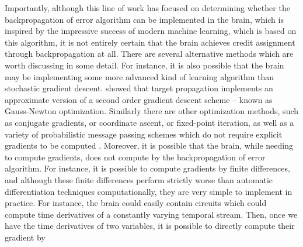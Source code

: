 Importantly, although this line of work has focused on determining whether the backpropagation of error algorithm can be implemented in the brain, which is inspired by the impressive success of modern machine learning, which is based on this algorithm, it is not entirely certain that the brain achieves credit assignment through backpropagation at all. There are several alternative methods which are worth discussing in some detail. For instance, it is also possible that the brain may be implementing some more advanced kind of learning algorithm than stochastic gradient descent. \citet{meulemans2020theoretical} showed that target propagation implements an approximate version of a second order gradient descent scheme -- known as Gauss-Newton optimization. Similarly there are other optimization methods, such as conjugate gradients, or coordinate ascent, or fixed-point iteration, as well as a variety of probabilistic message passing schemes which do not require explicit gradients to be computed \citep{yedidia2011message,parr2019neuronal}. Moreover, it is possible that the brain, while needing to compute gradients, does not compute by the backpropagation of error algorithm. For instance, it is possible to compute gradients by finite differences, and although these finite differences perform strictly worse than automatic differentiation techniques computationally, they are very simple to implement in practice. For instance, the brain could easily contain circuits which could compute time derivatives of a constantly varying temporal stream. Then, once we have the time derivatives of two variables, it is possible to directly compute their gradient by
